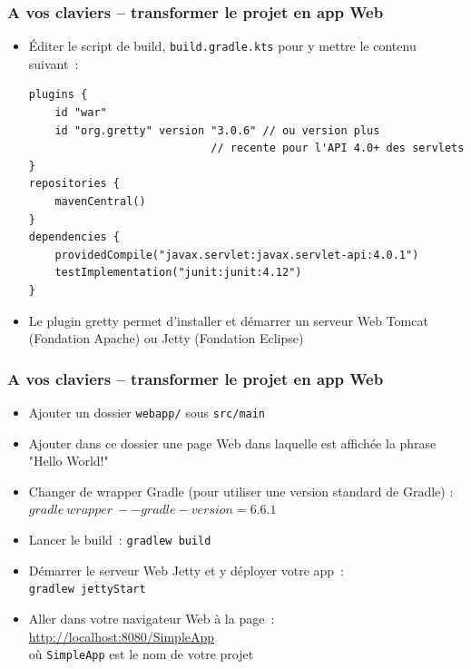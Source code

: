 \documentclass{beamer}
\begin{document}
\begin{frame}[fragile]
	\frametitle{A vos claviers -- transformer le projet en app Web}
	
	\begin{itemize}
		\item Éditer le script de build, \texttt{build.gradle.kts} pour y mettre le contenu suivant~:
		\footnotesize
\begin{lstlisting}
plugins {
	id "war"
	id "org.gretty" version "3.0.6" // ou version plus
							// recente pour l'API 4.0+ des servlets
}		
repositories {
	mavenCentral()
}
dependencies {
	providedCompile("javax.servlet:javax.servlet-api:4.0.1")
	testImplementation("junit:junit:4.12")
}	
\end{lstlisting}
		\normalsize
		\item[] Le plugin gretty permet d'installer et démarrer un serveur Web Tomcat (Fondation Apache) ou Jetty (Fondation Eclipse)

	\end{itemize}
\end{frame}

\begin{frame}
	\frametitle{A vos claviers -- transformer le projet en app Web}
	
	\begin{itemize}
		\item Ajouter un dossier \texttt{webapp/} sous \texttt{src/main}
		\item Ajouter dans ce dossier une page Web dans laquelle est affichée la phrase "Hello World!"
		\item Changer de wrapper Gradle (pour utiliser une version standard de Gradle) :
	$gradle~wrapper~--gradle-version=6.6.1$
	\item Lancer le build~: \texttt{gradlew build}
	\item Démarrer le serveur Web Jetty et y déployer votre app~:\\
	\texttt{gradlew jettyStart}
	\item Aller dans votre navigateur Web à la page~:\\
	\url{http://localhost:8080/SimpleApp}\\
	où \texttt{SimpleApp} est le nom de votre projet
	\end{itemize}
\end{frame}
\end{document}

